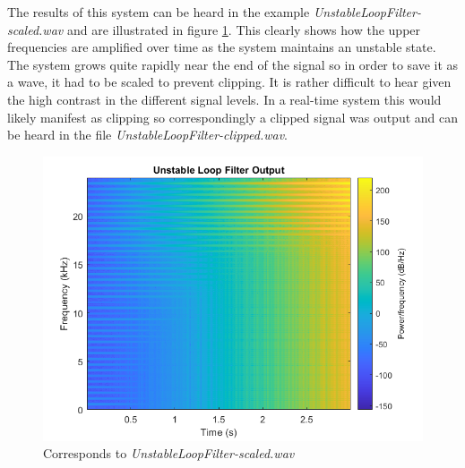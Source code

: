 \documentclass[../main.tex]{subfiles}
\begin{document}
The results of this system can be heard in the example \emph{UnstableLoopFilter-scaled.wav} and are illustrated in figure \ref{fig:UnstableLoop}. This clearly shows how the upper frequencies are amplified over time as the system maintains an unstable state. The system grows quite rapidly near the end of the signal so in order to save it as a wave, it had to be scaled to prevent clipping. It is rather difficult to hear given the high contrast in the different signal levels. In a real-time system this would likely manifest as clipping so correspondingly a clipped signal was output and can be heard in the file \emph{UnstableLoopFilter-clipped.wav}.

\begin{figure}[h]
    \centering
    \includegraphics[scale=.65]{./images/plots/UnstableLoopFilter.png}
    \caption{Corresponds to \emph{UnstableLoopFilter-scaled.wav}}
    \label{fig:UnstableLoop}
\end{figure}
\end{document}
